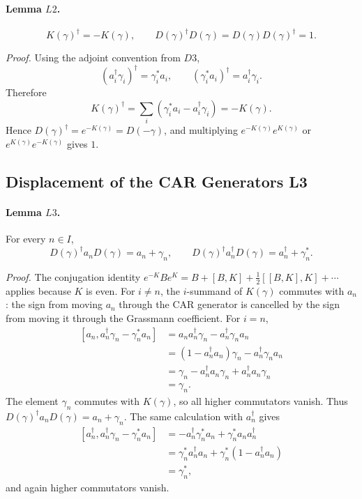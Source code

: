 \paragraph{Lemma \(L2\).}
\[
  K(\gamma)^\dagger=-K(\gamma),
  \qquad
  D(\gamma)^\dagger D(\gamma)=D(\gamma)D(\gamma)^\dagger=1 .
\]

\emph{Proof.}
Using the adjoint convention from \(D3\),
\[
  (a_i^\dagger\gamma_i)^\dagger=\gamma_i^*a_i,\qquad
  (\gamma_i^*a_i)^\dagger=a_i^\dagger\gamma_i .
\]
Therefore
\[
  K(\gamma)^\dagger
  =
  \sum_i(\gamma_i^*a_i-a_i^\dagger\gamma_i)
  =
  -K(\gamma).
\]
Hence \(D(\gamma)^\dagger=e^{-K(\gamma)}=D(-\gamma)\), and multiplying
\(e^{-K(\gamma)}e^{K(\gamma)}\) or \(e^{K(\gamma)}e^{-K(\gamma)}\) gives \(1\).

\subsection{Displacement of the CAR Generators L3}

\paragraph{Lemma \(L3\).}
For every \(n\in I\),
\[
  D(\gamma)^\dagger a_nD(\gamma)=a_n+\gamma_n,\qquad
  D(\gamma)^\dagger a_n^\dagger D(\gamma)=a_n^\dagger+\gamma_n^* .
\]

\emph{Proof.}
The conjugation identity \(e^{-K}Be^K=B+[B,K]+\frac12[[B,K],K]+\cdots\)
applies because \(K\) is even.  For \(i\neq n\), the \(i\)-summand of
\(K(\gamma)\) commutes with \(a_n\): the sign from moving \(a_n\) through the
CAR generator is cancelled by the sign from moving it through the Grassmann
coefficient.  For \(i=n\),
\[
\begin{aligned}
 [a_n,a_n^\dagger\gamma_n-\gamma_n^*a_n]
 &=
 a_na_n^\dagger\gamma_n-a_n^\dagger\gamma_na_n\\
 &=
 (1-a_n^\dagger a_n)\gamma_n-a_n^\dagger\gamma_na_n\\
 &=
 \gamma_n-a_n^\dagger a_n\gamma_n+a_n^\dagger a_n\gamma_n\\
 &=\gamma_n .
\end{aligned}
\]
The element \(\gamma_n\) commutes with \(K(\gamma)\), so all higher
commutators vanish.  Thus \(D(\gamma)^\dagger a_nD(\gamma)=a_n+\gamma_n\).
The same calculation with \(a_n^\dagger\) gives
\[
\begin{aligned}
 [a_n^\dagger,a_n^\dagger\gamma_n-\gamma_n^*a_n]
 &=
 -a_n^\dagger\gamma_n^*a_n+\gamma_n^*a_na_n^\dagger\\
 &=
 \gamma_n^*a_n^\dagger a_n+\gamma_n^*(1-a_n^\dagger a_n)\\
 &=\gamma_n^* ,
\end{aligned}
\]
and again higher commutators vanish.

